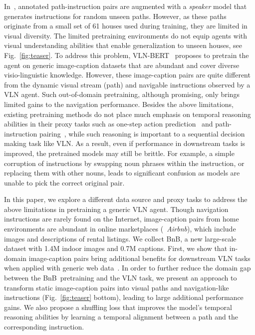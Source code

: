 \RequirePackage[dvipsnames,table]{xcolor} \documentclass[10pt,twocolumn,letterpaper]{article}
\newcommand{\vlnbert}{VLN-BERT}
\newcommand{\airbnb}{BnB}
\begin{document}
In~\cite{hao2020prevalent,huang2019transferable}, annotated path-instruction pairs
are augmented with a \emph{speaker} model that generates instructions for random unseen paths.
However, as these paths originate from a small set of 61 houses used during training, they are limited in visual diversity.
The limited pretraining environments do not equip agents with visual understanding abilities that enable generalization to unseen houses, see Fig.~\ref{fig:teaser}.
To address this problem, \vlnbert~\cite{majumdar2020vlnbert} proposes to pretrain the agent on generic image-caption datasets that are abundant and cover diverse visio-linguistic knowledge.
However, these image-caption pairs are quite different from the dynamic visual stream (path) and navigable instructions observed by a VLN agent.
Such out-of-domain pretraining, although promising, only brings limited gains to the navigation performance.
Besides the above limitations, existing pretraining methods do not place much emphasis on temporal reasoning abilities in their proxy tasks such as one-step action prediction~\cite{hao2020prevalent} and path-instruction pairing~\cite{majumdar2020vlnbert}, while such reasoning is important to a sequential decision making task like VLN.
As a result, even if performance in downstream tasks is improved, the pretrained models may still be brittle.
For example, a simple corruption of instructions by swapping noun phrases within the instruction, or replacing them with other nouns, leads to significant confusion as models are unable to pick the correct original pair. 

In this paper, we explore a different data source and proxy tasks to address the above limitations in pretraining a generic VLN agent.
Though navigation instructions are rarely found on the Internet, image-caption pairs from home environments are abundant in online marketplaces (\eg~\emph{Airbnb}), which include images and descriptions of rental listings.
We collect \airbnb, a new large-scale dataset with 1.4M indoor images and 0.7M captions.
First, we show that in-domain image-caption pairs bring additional benefits for downstream VLN tasks when applied with generic web data~\cite{majumdar2020vlnbert}.
In order to further reduce the domain gap between the \airbnb~pretraining and the VLN task, we present an approach to transform static image-caption pairs into visual paths and navigation-like instructions (Fig.~\ref{fig:teaser} bottom), leading to large additional performance gains.
We also propose a shuffling loss that improves the model's temporal reasoning abilities by learning a temporal alignment between a path and the corresponding instruction.
\end{document}
